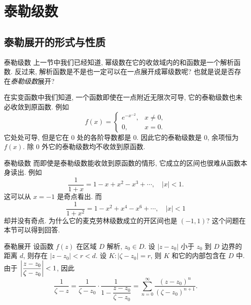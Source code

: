 \section{泰勒级数}

\subsection{泰勒展开的形式与性质}
\begin{frame}{泰勒级数}
\onslide<+->
上一节中我们已经知道, 幂级数在它的收敛域内的和函数是一个解析函数.
\onslide<+->
反过来, 解析函数是不是也一定可以在一点展开成幂级数呢? 也就是说是否存在\emph{泰勒级数}展开?

\onslide<+->
在实变函数中我们知道, 一个函数即使在一点附近无限次可导, 它的泰勒级数也未必收敛到原函数.
\onslide<+->
例如
\[f(x)=\begin{cases}
e^{-x^{-2}},&x\neq 0,\\
0,&x=0.\end{cases}\]
\onslide<+->
它处处可导, 但是它在 $0$ 处的各阶导数都是 $0$.
\onslide<+->
因此它的泰勒级数是 $0$, 余项恒为 $f(x)$.
\onslide<+->
除 $0$ 外它的泰勒级数均不收敛到原函数.
\end{frame}


\begin{frame}{泰勒级数}
\onslide<+->
而即使是泰勒级数能收敛到原函数的情形, 它成立的区间也很难从函数本身读出.
\onslide<+->
例如
\[\dfrac1{1+x}=1-x+x^2-x^3+\cdots,\quad|x|<1.\]
\onslide<+->
这可以从 $x=-1$ 是奇点看出.
\onslide<+->
而
\[\dfrac1{1+x^2}=1-x^2+x^4-x^6+\cdots,\quad|x|<1\]
却并没有奇点.
\onslide<+->
为什么它的麦克劳林级数成立的开区间也是 $(-1,1)$?
\onslide<+->
这个问题在本节可以得到回答.
\end{frame}


\begin{frame}{泰勒展开}
\onslide<+->
设函数 $f(z)$ 在区域 $D$ 解析, $z_0\in D$.
\onslide<+->
设 $|z-z_0|$ 小于 $z_0$ 到 $D$ 边界的距离 $d$,
则存在 $|z-z_0|<r<d$.
\onslide<+->
设 $K:|\zeta-z_0|=r$, 则 $K$ 和它的内部包含在 $D$ 中.
\onslide<+->
由于 $\left|\dfrac{z-z_0}{\zeta-z_0}\right|<1$, 因此
\[\frac1{\zeta-z}=\frac1{\zeta-z_0}\cdot\frac1{1-\dfrac{z-z_0}{\zeta-z_0}}=\sum_{n=0}^\infty\frac{(z-z_0)^n}{(\zeta-z_0)^{n+1}}.\]

\begin{center}
\end{center}
\end{frame}


